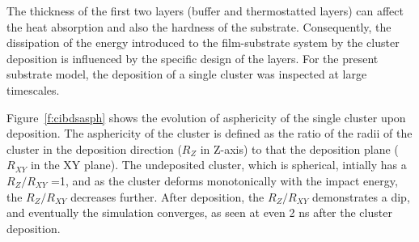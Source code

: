 \begin{changebar}
The thickness of the first two layers (buffer and thermostatted layers) can affect the heat absorption and also the hardness of the substrate. Consequently, the dissipation of the energy introduced to the film-substrate system by the cluster deposition is influenced by the specific design of the layers.  For the present substrate model, the deposition of a single cluster was inspected at large timescales. \end{changebar} Figure~\ref{f:cibdsasph} shows the evolution of asphericity of the single cluster upon deposition. The asphericity of the cluster is defined as the ratio of the radii of the cluster in the deposition direction ($R_{Z}$ in Z-axis) to that the deposition plane ($R_{XY}$ in the XY plane). The undeposited cluster, which is spherical, intially has a $R_{Z}/R_{XY}$ =1, and as the cluster deforms monotonically with the impact energy, the $R_{Z}/R_{XY}$ decreases further. After deposition, the $R_{Z}/R_{XY}$ demonstrates a dip, and eventually the simulation converges, as seen at even 2 ns after the cluster deposition. \par


%
